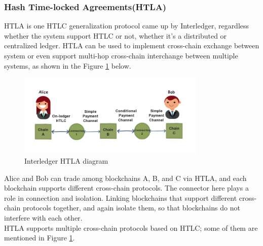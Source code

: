\subsubsection{Hash Time-locked Agreements(HTLA)}
\noindent HTLA is one HTLC generalization protocol came up by Interledger\cite{HTLA}, regardless whether the system support HTLC or not, whether it's a distributed or centralized ledger. HTLA can be used to implement cross-chain exchange between system or even support multi-hop cross-chain interchange between multiple systems, as shown in the Figure \ref{fig:HTLA} below.
   \begin{figure}[H]
    \includegraphics[width=0.8\textwidth]{./figures/HTLA.png}
    \centering
    \caption{Interledger HTLA diagram}%
    \centering
    \label{fig:HTLA}
    \end{figure}
    
\noindent Alice and Bob can trade among blockchains A, B, and C via HTLA, and each blockchain supports different cross-chain protocols. The connector here plays a role in connection and isolation. Linking blockchains that support different cross-chain protocols together, and again isolate them, so that blockchains do not interfere with each other.\\
\noindent HTLA supports multiple cross-chain protocols based on HTLC; some of them are mentioned in Figure \ref{fig:HTLA}.


